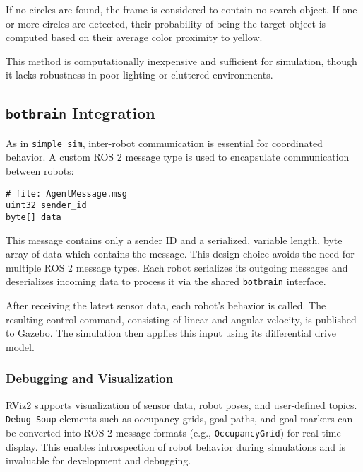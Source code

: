 If no circles are found, the frame is considered to contain no search object. If one or more circles are detected, their probability of being the target object is computed based on their average color proximity to yellow.

This method is computationally inexpensive and sufficient for simulation, though it lacks robustness in poor lighting or cluttered environments.

\subsection{\texttt{botbrain} Integration}
\label{sub:Botbrain_integration}
As in \texttt{simple\_sim}, inter-robot communication is essential for coordinated behavior. A custom ROS 2 message type is used to encapsulate communication between robots:

\begin{verbatim}
# file: AgentMessage.msg
uint32 sender_id
byte[] data
\end{verbatim}

This message contains only a sender ID and a serialized, variable length, byte array of data which contains the message. This design choice avoids the need for multiple ROS 2 message types. Each robot serializes its outgoing messages and deserializes incoming data to process it via the shared \texttt{botbrain} interface.

After receiving the latest sensor data, each robot's behavior is called. The resulting control command, consisting of linear and angular velocity, is published to Gazebo. The simulation then applies this input using its differential drive model.

\subsubsection{Debugging and Visualization}
\label{sec:debugging_rviz}


RViz2 supports visualization of sensor data, robot poses, and user-defined topics. \texttt{Debug Soup} elements such as occupancy grids, goal paths, and goal markers can be converted into ROS 2 message formats (e.g., \texttt{OccupancyGrid}) for real-time display. This enables introspection of robot behavior during simulations and is invaluable for development and debugging.
